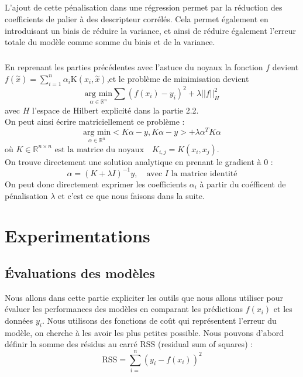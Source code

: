 \documentclass[a4paper,12pt,titlepage]{report}
\begin{document}
\paragraph{}
L'ajout de cette pénalisation dans une régression permet par la réduction des coefficients de palier à des descripteur corrélés. Cela permet également en introduisant un biais de réduire la variance, et ainsi de réduire également l'erreur totale du modèle comme somme du biais et de la variance.
\paragraph{}
En reprenant les parties précédentes avec l'astuce du noyaux la fonction $f$ devient $f(\overset{\sim}{x}) = \sum_{i = 1}^{n}{\alpha_i \text{K}(x_i , \overset{\sim}{x})}$,et le problème de minimisation devient 
\[
\underset{\alpha \in \mathbb{R}^{n}}{\text{arg min}}\sum{(f(x_i) - y_i)^{2}} +  \lambda ||f||_H^{2}
\]
avec $H$ l'espace de Hilbert explicité dans la partie 2.2. \\
On peut ainsi écrire matriciellement ce problème :
\[
	\underset{\alpha \in \mathbb{R}^{n}}{\text{arg min}}<K \alpha - y , K 	\alpha -y > + \lambda \alpha^{T} K \alpha 
\]
$\text{où } K \in \mathbb{R}^{n \times n} \text{ est la matrice du 			noyaux} \quad K_{i,j} = K(x_i, x_j)$. \\
On trouve directement une solution analytique en prenant le gradient à 0 :
\[
\alpha	=(K + \lambda I)^{-1}y, \quad \text{avec $I$ la matrice identité}
\]
On peut donc directement exprimer les coefficients $\alpha_i$ à partir du coéfficent de pénalisation $\lambda$ et c'est ce que nous faisons dans la suite.


\chapter{Experimentations}
\section{Évaluations des modèles}
Nous allons dans cette partie expliciter les outils que nous allons utiliser pour évaluer les performances des modèles en comparant les prédictions $f(x_i)$ et les données $y_i$. Nous utilisons des fonctions de coût qui représentent l'erreur du modèle, on cherche à les avoir les plus petites possible. 
Nous pouvons d'abord définir la somme des résidus au carré RSS (residual sum of squares) : 
\[
\text{RSS} = \sum_{i=}^n {(y_i - f(x_i))^2}
\] 
\end{document}
